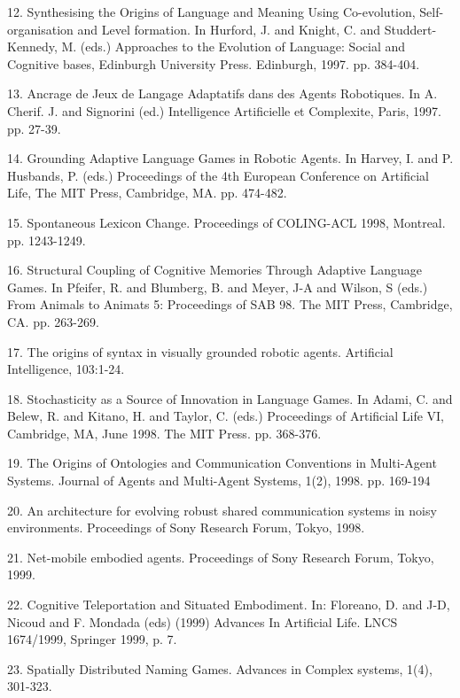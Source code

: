 12. \citet{Steels:97f} Synthesising the Origins of Language and Meaning Using Co-evolution, Self-organisation and Level formation. In Hurford, J. and Knight, C. and Studdert-Kennedy, M. (eds.) Approaches to the Evolution of Language: Social and Cognitive bases, Edinburgh University Press. Edinburgh, 1997. pp. 384-404. 

\enlargethispage{1em}
13. \citet{Steels:97g} Ancrage de Jeux de Langage Adaptatifs dans des Agents Robotiques. In A. Cherif. J. and Signorini (ed.) Intelligence Artificielle et Complexite, Paris, 1997. pp. 27-39. 

14. \citet{Steels:97h} Grounding Adaptive Language Games in Robotic Agents. In Harvey, I. and P. Husbands, P. (eds.) Proceedings of the 4th European Conference on Artificial Life, The MIT Press, Cambridge, MA. pp. 474-482.

15. \citet{Steels:98a} Spontaneous Lexicon Change. Proceedings of COLING-ACL 1998, Montreal. pp. 1243-1249. 

16. \citet{Steels:98b} Structural Coupling of Cognitive Memories Through Adaptive Language Games. In Pfeifer, R. and Blumberg, B. and Meyer, J-A and Wilson, S (eds.) From Animals to Animats 5: Proceedings of SAB 98. The MIT Press, Cambridge, CA. pp. 263-269. 

17. \citet{Steels:98c} The origins of syntax in visually grounded robotic agents. Artificial Intelligence, 103:1-24. 

18. \citet{Steels:98d} Stochasticity as a Source of Innovation in Language Games. In Adami, C. and Belew, R. and Kitano, H. and Taylor, C. (eds.) Proceedings of Artificial Life VI, Cambridge, MA, June 1998. The MIT Press. pp. 368-376. 

19. \citet{Steels:98e} The Origins of Ontologies and Communication Conventions in Multi-Agent Systems. Journal of Agents and Multi-Agent Systems, 1(2), 1998. pp. 169-194

20. \citet{Kaplan:98f} An architecture for evolving robust shared communication systems in noisy environments. Proceedings of Sony Research Forum, Tokyo, 1998.

21. \citet{mcintyre:99a} Net-mobile embodied agents. Proceedings of Sony Research Forum, Tokyo, 1999.

22. \citet{Steels:99b} Cognitive Teleportation and Situated Embodiment. In: Floreano, D. and J-D, Nicoud and F. 
Mondada (eds) (1999) Advances In Artificial Life. LNCS 1674/1999, Springer 1999, p. 7. 

23. \citet{Steels:99c} Spatially Distributed Naming Games. Advances in Complex systems, 1(4), 301-323. 


